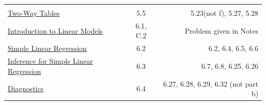 \documentclass[]{book}
\theoremstyle{definition}
\theoremstyle{definition}
\theoremstyle{definition}
\theoremstyle{remark}
\begin{document}
\begin{longtable}[]{@{}lcr@{}}
\begin{minipage}[t]{0.29\columnwidth}
\end{minipage}\tabularnewline
\begin{minipage}[t]{0.29\columnwidth}\raggedright\strut
\protect\hyperlink{L28}{Two-Way Tables}\strut
\end{minipage} & \begin{minipage}[t]{0.33\columnwidth}\centering\strut
5.5\strut
\end{minipage} & \begin{minipage}[t]{0.29\columnwidth}\raggedleft\strut
5.23(not f), 5.27, 5.28\strut
\end{minipage}\tabularnewline
\begin{minipage}[t]{0.29\columnwidth}\raggedright\strut
\protect\hyperlink{L29}{Introduction to Linear Models}\strut
\end{minipage} & \begin{minipage}[t]{0.33\columnwidth}\centering\strut
6.1, C.2\strut
\end{minipage} & \begin{minipage}[t]{0.29\columnwidth}\raggedleft\strut
Problem given in Notes\strut
\end{minipage}\tabularnewline
\begin{minipage}[t]{0.29\columnwidth}\raggedright\strut
\protect\hyperlink{L30}{Simple Linear Regression}\strut
\end{minipage} & \begin{minipage}[t]{0.33\columnwidth}\centering\strut
6.2\strut
\end{minipage} & \begin{minipage}[t]{0.29\columnwidth}\raggedleft\strut
6.2, 6.4, 6.5, 6.6\strut
\end{minipage}\tabularnewline
\begin{minipage}[t]{0.29\columnwidth}\raggedright\strut
\protect\hyperlink{L31}{Inference for Simple Linear Regression}\strut
\end{minipage} & \begin{minipage}[t]{0.33\columnwidth}\centering\strut
6.3\strut
\end{minipage} & \begin{minipage}[t]{0.29\columnwidth}\raggedleft\strut
6.7, 6.8, 6.25, 6.26\strut
\end{minipage}\tabularnewline
\begin{minipage}[t]{0.29\columnwidth}\raggedright\strut
\protect\hyperlink{L32}{Diagnostics}\strut
\end{minipage} & \begin{minipage}[t]{0.33\columnwidth}\centering\strut
6.4\strut
\end{minipage} & \begin{minipage}[t]{0.29\columnwidth}\raggedleft\strut
6.27, 6.28, 6.29, 6.32 (not part b)\strut
\end{minipage}\tabularnewline
\bottomrule
\end{longtable}
\end{document}
